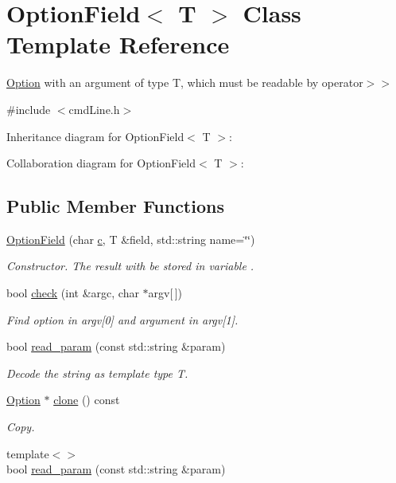 \hypertarget{classOptionField}{}\section{Option\+Field$<$ T $>$ Class Template Reference}
\label{classOptionField}


\hyperlink{classOption}{Option} with an argument of type T, which must be readable by operator$>$$>$  




{\ttfamily \#include $<$cmd\+Line.\+h$>$}



Inheritance diagram for Option\+Field$<$ T $>$\+:


Collaboration diagram for Option\+Field$<$ T $>$\+:
\subsection*{Public Member Functions}
\begin{DoxyCompactItemize}
\item 
\hyperlink{classOptionField_ad7651005016a2b98ffc53207f9dce681}{Option\+Field} (char \hyperlink{classOption_a496b793630fcab592951643fe2c651d6}{c}, T \&field, std\+::string name=\char`\"{}\char`\"{})
\begin{DoxyCompactList}\small\item\em Constructor. The result with be stored in variable . \end{DoxyCompactList}\item 
bool \hyperlink{classOptionField_ac78faa83373a77a7b9149c339ecfd111}{check} (int \&argc, char $\ast$argv\mbox{[}$\,$\mbox{]})
\begin{DoxyCompactList}\small\item\em Find option in argv\mbox{[}0\mbox{]} and argument in argv\mbox{[}1\mbox{]}. \end{DoxyCompactList}\item 
bool \hyperlink{classOptionField_ab5ae96fe39a59866635eacfba07a4957}{read\+\_\+param} (const std\+::string \&param)
\begin{DoxyCompactList}\small\item\em Decode the string as template type T. \end{DoxyCompactList}\item 
\hyperlink{classOption}{Option} $\ast$ \hyperlink{classOptionField_a44641afd5aae01ff1c440e8d00915f6f}{clone} () const 
\begin{DoxyCompactList}\small\item\em Copy. \end{DoxyCompactList}\item 
{\footnotesize template$<$$>$ }\\bool \hyperlink{classOptionField_a0782cd5c0e54c4d8798b440dea4b2cad}{read\+\_\+param} (const std\+::string \&param)
\end{DoxyCompactItemize}
